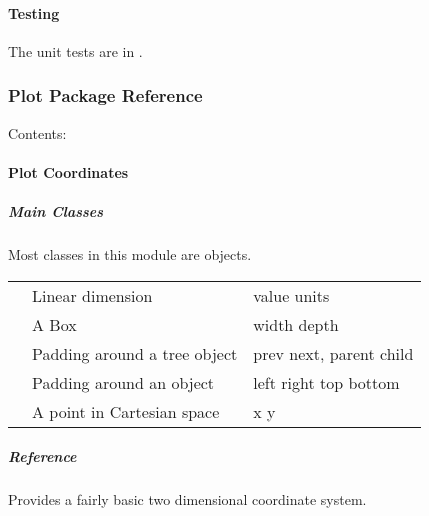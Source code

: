 \documentclass[letterpaper,10pt,english]{sphinxmanual}
\begin{document}
\paragraph{Testing}
\label{\detokenize{ref/util/XmlWrite:testing}}
The unit tests are in .


\subsubsection{Plot Package Reference}
\label{\detokenize{ref/util/plot/index_plot:plot-package-reference}}\label{\detokenize{ref/util/plot/index_plot::doc}}
Contents:


\paragraph{Plot Coordinates}
\label{\detokenize{ref/util/plot/Coord::doc}}\label{\detokenize{ref/util/plot/Coord:plot-coordinates}}

\subparagraph{Main Classes}
\label{\detokenize{ref/util/plot/Coord:main-classes}}
Most classes in this module are  objects.


\begin{savenotes}\sphinxattablestart
\centering
\begin{tabulary}{\linewidth}[t]{|T|T|T|}
\hline
{}\relax &\relax &\relax \\
\hline
{}
&
Linear dimension
&
value units
\\
\hline
{}
&
A Box
&
width depth
\\
\hline
{}
&
Padding around a tree object
&
prev next, parent child
\\
\hline
{}
&
Padding around an  object
&
left right top bottom
\\
\hline
{}
&
A point in Cartesian space
&
x y
\\
\hline
\end{tabulary}
\par
\sphinxattableend\end{savenotes}


\subparagraph{Reference}
\label{\detokenize{ref/util/plot/Coord:reference}}\label{\detokenize{ref/util/plot/Coord:module-TotalDepth.util.plot.Coord}}
Provides a fairly basic two dimensional coordinate system.
\end{document}
